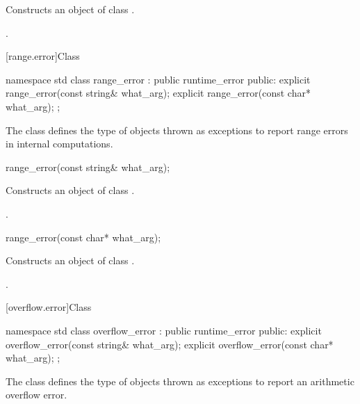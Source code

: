\begin{itemdescr}
\pnum
\effects
Constructs an object of class
.

\pnum
\postconditions
{}.
\end{itemdescr}

[range.error]{Class }

%
\begin{codeblock}
namespace std {
  class range_error : public runtime_error {
  public:
    explicit range_error(const string& what_arg);
    explicit range_error(const char* what_arg);
  };
}
\end{codeblock}

\pnum
The class
defines the type of objects thrown as exceptions to report range errors
in internal computations.

%
\begin{itemdecl}
range_error(const string& what_arg);
\end{itemdecl}

\begin{itemdescr}
\pnum
\effects
Constructs an object of class
.

\pnum
\postconditions
{}.
\end{itemdescr}

%
\begin{itemdecl}
range_error(const char* what_arg);
\end{itemdecl}

\begin{itemdescr}
\pnum
\effects
Constructs an object of class
.

\pnum
\postconditions
{}.
\end{itemdescr}

[overflow.error]{Class }

%
\begin{codeblock}
namespace std {
  class overflow_error : public runtime_error {
  public:
    explicit overflow_error(const string& what_arg);
    explicit overflow_error(const char* what_arg);
  };
}
\end{codeblock}

\pnum
The class
defines the type of objects thrown as exceptions to report an arithmetic overflow error.

